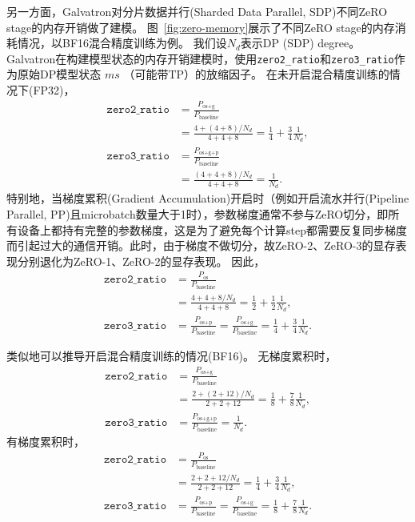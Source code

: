 \documentclass{thuemp}
\begin{document}
另一方面，Galvatron对分片数据并行(Sharded Data Parallel, SDP)不同ZeRO stage的内存开销做了建模。
图~\ref{fig:zero-memory}展示了不同ZeRO stage的内存消耗情况，以BF16混合精度训练为例。
我们设$N_d$表示DP (SDP) degree。
Galvatron在构建模型状态的内存开销建模时，使用\texttt{zero2\_ratio}和\texttt{zero3\_ratio}作为原始DP模型状态 $ms$ （可能带TP）的放缩因子。
在未开启混合精度训练的情况下(FP32)，
\begin{align*}
    \texttt{zero2\_ratio} &= \frac{P_{\text{os+g}}}{P_{\text{baseline}}} \\
    &= \frac{4+(4+8)/N_d}{4+4+8} = \frac{1}{4}+\frac{3}{4}\frac{1}{N_d}, \\
    \texttt{zero3\_ratio} &= \frac{P_{\text{os+g+p}}}{P_{\text{baseline}}} \\
    &= \frac{(4+4+8)/N_d}{4+4+8}=\frac{1}{N_d}.
\end{align*}
特别地，当梯度累积(Gradient Accumulation)开启时（例如开启流水并行(Pipeline Parallel, PP)且microbatch数量大于1时），参数梯度通常不参与ZeRO切分，即所有设备上都持有完整的参数梯度，这是为了避免每个计算step都需要反复同步梯度而引起过大的通信开销。此时，由于梯度不做切分，故ZeRO-2、ZeRO-3的显存表现分别退化为ZeRO-1、ZeRO-2的显存表现。
因此，
\begin{align*}
    \texttt{zero2\_ratio} &= \frac{P_{\text{os}}}{P_{\text{baseline}}} \\
    &= \frac{4+4+8/N_d}{4+4+8} = \frac{1}{2}+\frac{1}{2}\frac{1}{N_d}, \\
    \texttt{zero3\_ratio} &= \frac{P_{\text{os+p}}}{P_{\text{baseline}}} = \frac{P_{\text{os+g}}}{P_{\text{baseline}}} = \frac{1}{4}+\frac{3}{4}\frac{1}{N_d}.
\end{align*}

类似地可以推导开启混合精度训练的情况(BF16)。
无梯度累积时，
\begin{align*}
    \texttt{zero2\_ratio} &= \frac{P_{\text{os+g}}}{P_{\text{baseline}}} \\
    &= \frac{2+(2+12)/N_d}{2+2+12} = \frac{1}{8}+\frac{7}{8}\frac{1}{N_d}, \\
    \texttt{zero3\_ratio} &= \frac{P_{\text{os+g+p}}}{P_{\text{baseline}}} = \frac{1}{N_d}.
\end{align*}
有梯度累积时，
\begin{align*}
    \texttt{zero2\_ratio} &= \frac{P_{\text{os}}}{P_{\text{baseline}}} \\
    &= \frac{2+2+12/N_d}{2+2+12}=\frac{1}{4}+\frac{3}{4}\frac{1}{N_d}, \\
    \texttt{zero3\_ratio} &= \frac{P_{\text{os+p}}}{P_{\text{baseline}}} = \frac{P_{\text{os+g}}}{P_{\text{baseline}}} = \frac{1}{8}+\frac{7}{8}\frac{1}{N_d}.
\end{align*}
\end{document}

